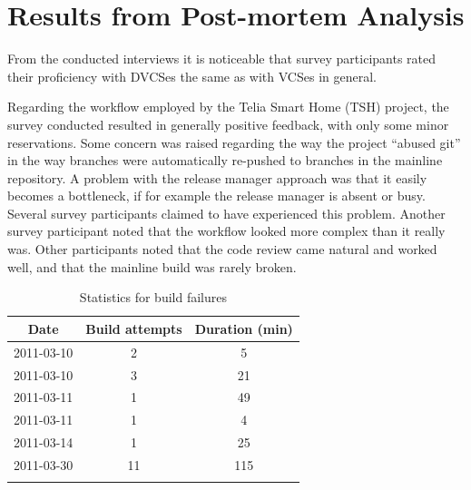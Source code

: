 \documentclass{llncs}
\begin{document}
\section{Results from Post-mortem Analysis}

From the conducted interviews it is noticeable that survey participants
rated their proficiency with DVCSes the same as with VCSes in general.

Regarding the workflow employed by the Telia Smart Home (TSH)
project, the survey conducted resulted in generally positive feedback,
with only some minor reservations. Some concern was raised regarding
the way the project ``abused git'' in the way branches were
automatically re-pushed to branches in the mainline
repository. A problem with the release manager approach was that it
easily becomes a bottleneck, if for example the release manager is
absent or busy. Several survey participants claimed to have
experienced this problem. Another survey participant noted that the
workflow looked more complex than it really was. Other participants
noted that the code review came natural and worked well, and that the
mainline build was rarely broken.

\begin{table}[tp]
 \begin{center}
  \begin{tabular}{ccc}
   \toprule
   Date & Build attempts & Duration (min) \\
   \midrule
   2011-03-10 & 2 & 5 \\
   2011-03-10 & 3 & 21 \\
   2011-03-11 & 1 & 49 \\
   2011-03-11 & 1 & 4 \\
   2011-03-14 & 1 & 25 \\
   2011-03-30 & 11 & 115 \\
   \bottomrule
   \\[-0.7em]
  \end{tabular}
  \caption{Statistics for build failures}
  \label{tbl:breakage}
 \end{center}
\end{table}
\end{document}
